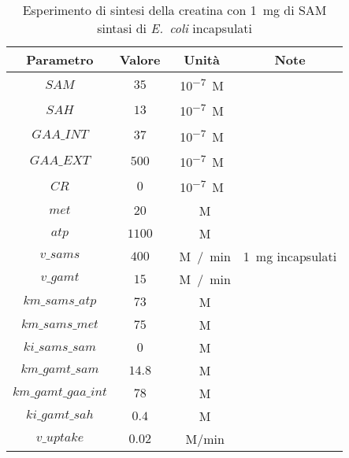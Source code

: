 \begin{table}[H]
	\centering
	\begin{tabular}{| c | c | c | c |}
	\hline
	Parametro & Valore & Unit\`a & Note \\
		\hline
		$SAM$ & $35$ & \si{10^{-7} M} & \\
		\hline
		$SAH$ & $13$ & \si{10^{-7} M} & \\
		\hline
		$GAA\_INT$ & $37$ & \si{10^{-7} M} & \\
		\hline
		$GAA\_EXT$ & $500$ & \si{10^{-7} M} & \\
		\hline
		$CR$ & $0$ & \si{10^{-7} M} & \\
		\hline
		$met$ & $20$ & \si{\mu M} & \\
		\hline
		$atp$ & $1100$ & \si{\mu M} & \\
		\hline
		$v\_sams$ & $400$ & \si{\mu M / min} & \SI{1}{mg} incapsulati \\
		\hline
		$v\_gamt$ & $15$ & \si{\mu M / min} & \\
		\hline
		$km\_sams\_atp$ & $73$ & \si{\mu M} & \\
		\hline
		$km\_sams\_met$ & $75$ & \si{\mu M} & \\
		\hline
		$ki\_sams\_sam$ & $0$ & \si{\mu M} & \\
		\hline
		$km\_gamt\_sam$ & $14.8$ & \si{\mu M} & \\
		\hline
		$km\_gamt\_gaa\_int$ & $78$ & \si{\mu M} & \\
		\hline
		$ki\_gamt\_sah$ & $0.4$ & \si{\mu M} & \\
		\hline
		$v\_uptake$ & $0.02$ & \si{\mu M/min} & \\
		\hline
	\end{tabular}
	\caption{Esperimento di sintesi della creatina con \SI{1}{mg} di SAM sintasi di \emph{E.\ coli} incapsulati}
	\label{mod:12}
\end{table}

